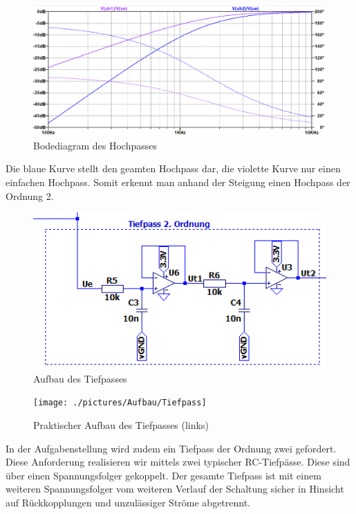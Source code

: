 \begin{figure}[htb]
    \includegraphics[width=16cm]{./pictures/Hochpass_Bode}
    \caption{Bodediagram des Hochpasses}
    \label{fig:HochpassBode}
\end{figure}

Die blaue Kurve stellt den geamten Hochpass dar, die violette Kurve nur einen einfachen Hochpass. Somit erkennt man anhand der Steigung einen Hochpass der Ordnung 2.

\newpage
\begin{figure}[htb]
    \includegraphics[width=14cm]{./pictures/Tiefpass}
    \caption{Aufbau des Tiefpasses}
    \label{fig:Tiefpass}
\end{figure}

\begin{figure}[htb]
    \texttt{[image: ./pictures/Aufbau/Tiefpass]}
    \caption{Praktischer Aufbau des Tiefpasses (links)}
    \label{fig:TiefpassPraktisch}
\end{figure}

In der Aufgabenstellung wird zudem ein Tiefpass der Ordnung zwei gefordert. Diese Anforderung realisieren wir mittels zwei typischer RC-Tiefpässe. Diese sind über einen Spannungsfolger gekoppelt. Der gesamte Tiefpass ist mit einem weiteren Spannungsfolger vom weiteren Verlauf der Schaltung sicher in Hinsicht auf Rückkopplungen und unzulässiger Ströme abgetrennt.


